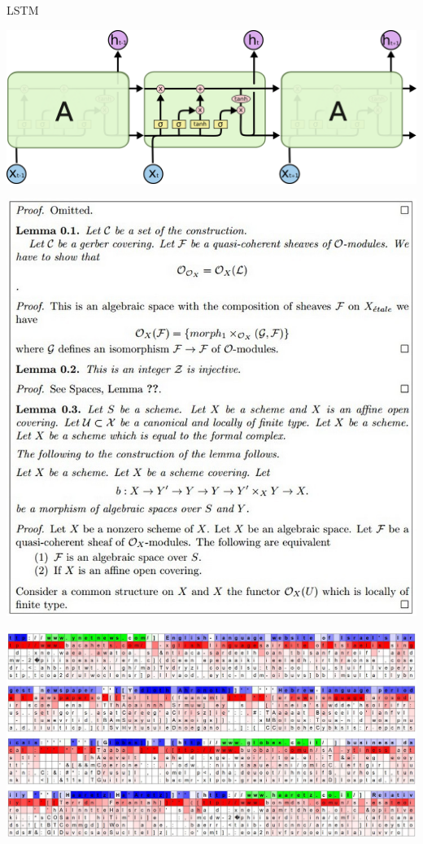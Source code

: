 \documentclass{beamer}
\begin{document}
\begin{frame}{LSTM}
  \begin{center}
    \includegraphics[width=\textwidth]{LSTM3-chain}
  \end{center}
\end{frame}


\begin{frame}
  \begin{center}
    \includegraphics[height=\textheight]{../latex3}
  \end{center}
\end{frame}


\begin{frame}
  \begin{center}
    \includegraphics[width=\textwidth]{lstm1}
  \end{center}
\end{frame}
\end{document}
